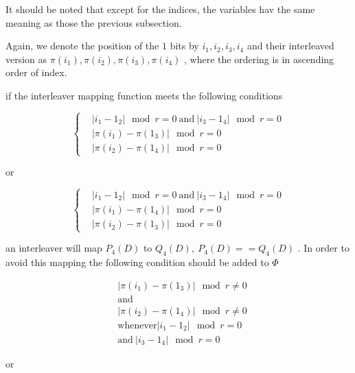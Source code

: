 \documentclass[11pt, oneside, dvipdfmx]{book}
\begin{document}
It should be noted that except for the indices, the variables hav the same meaning as those the previous subsection.

Again, we denote the position of the $1$ bits by $i_1,i_2,i_3,i_4$ and their interleaved version as $\pi(i_1),\pi(i_2),\pi(i_3),\pi(i_4)$ , where the ordering is in ascending order of index.

if the interleaver mapping function meets the following conditions 

\begin{equation*}
    \begin{cases}
      &|i_1-1_2| \mod r =0 ~\text{and}~ |i_3-1_4| \mod r =0\\
      &|\pi(i_1)-\pi(1_3)| \mod r =0\\
      &|\pi(i_2)-\pi(1_4)| \mod r =0
    \end{cases}
  \end{equation*}
  
  or 
  
  \begin{equation*}
    \begin{cases}
     
      &|i_1-1_2| \mod r =0 ~\text{and}~ |i_3-1_4| \mod r =0\\
      &|\pi(i_1)-\pi(1_4)| \mod r =0\\
      &|\pi(i_2)-\pi(1_3)| \mod r =0
    \end{cases}
  \end{equation*}

an interleaver will map $P_4(D)$ to $Q_4(D),~P_4(D)==Q_4(D)$ . In order to avoid this mapping the following condition should be added to $\Phi$

\begin{equation*}
   \begin{split}
 	&|\pi(i_1)-\pi(1_3)| \mod r \neq 0\\
 	&\text{and}\\
     &|\pi(i_2)-\pi(1_4)| \mod r \neq 0 \\
     &\text{whenever}
      |i_1-1_2| \mod r =0 \\
      &\text{and}~ |i_3-1_4| \mod r =0
      \end{split}
\end{equation*}

or
\end{document}
